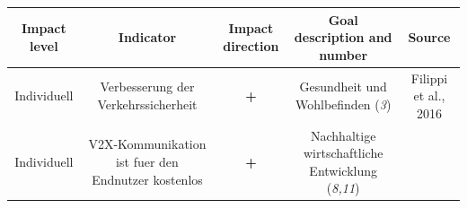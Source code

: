 \documentclass[
]{book}
\begin{document}
\begin{longtable}[]{@{}ccccc@{}}
\toprule
\begin{minipage}[b]{0.17\columnwidth}\centering
Impact level\strut
\end{minipage} & \begin{minipage}[b]{0.16\columnwidth}\centering
Indicator\strut
\end{minipage} & \begin{minipage}[b]{0.17\columnwidth}\centering
Impact direction\strut
\end{minipage} & \begin{minipage}[b]{0.17\columnwidth}\centering
Goal description and number\strut
\end{minipage} & \begin{minipage}[b]{0.17\columnwidth}\centering
Source\strut
\end{minipage}\tabularnewline
\midrule
\endhead
\begin{minipage}[t]{0.17\columnwidth}\centering
Individuell\strut
\end{minipage} & \begin{minipage}[t]{0.16\columnwidth}\centering
Verbesserung der Verkehrssicherheit\strut
\end{minipage} & \begin{minipage}[t]{0.17\columnwidth}\centering
\textbf{+}\strut
\end{minipage} & \begin{minipage}[t]{0.17\columnwidth}\centering
Gesundheit und Wohlbefinden (\emph{3})\strut
\end{minipage} & \begin{minipage}[t]{0.17\columnwidth}\centering
Filippi et al., 2016\strut
\end{minipage}\tabularnewline
\begin{minipage}[t]{0.17\columnwidth}\centering
Individuell\strut
\end{minipage} & \begin{minipage}[t]{0.16\columnwidth}\centering
V2X-Kommunikation ist fuer den Endnutzer kostenlos\strut
\end{minipage} & \begin{minipage}[t]{0.17\columnwidth}\centering
\textbf{+}\strut
\end{minipage} & \begin{minipage}[t]{0.17\columnwidth}\centering
Nachhaltige wirtschaftliche Entwicklung (\emph{8,11})\strut
\end{minipage} & \begin{minipage}[t]{0.17\columnwidth}\centering

\end{minipage}
\end{longtable}
\end{document}
